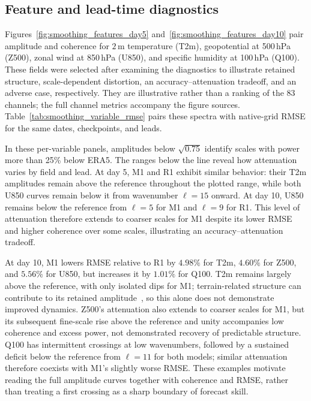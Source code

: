 \documentclass{article}
\newcommand{\vfourchange}[1]{{\color{blue}#1}}
\newcommand{\vfourred}[1]{{\color{blue}#1}}
\begin{document}
\subsection{\vfourred{Feature and lead-time diagnostics}}
\label{app:smoothing_features}
\label{app:smoothing_reset}

\vfourred{Figures~\ref{fig:smoothing_features_day5} and~\ref{fig:smoothing_features_day10} pair amplitude and coherence for $2$\,m temperature (T2m), geopotential at 500\,hPa (Z500), zonal wind at 850\,hPa (U850), and specific humidity at 100\,hPa (Q100). These fields were selected after examining the diagnostics to illustrate retained structure, scale-dependent distortion, an accuracy--attenuation tradeoff, and an adverse case, respectively. They are illustrative rather than a ranking of the 83 channels; the full channel metrics accompany the figure sources. Table~\ref{tab:smoothing_variable_rmse} pairs these spectra with native-grid RMSE for the same dates, checkpoints, and leads.}

\vfourred{In these per-variable panels, amplitudes below $\sqrt{0.75}$ identify scales with power more than 25\% below ERA5. The ranges below the line reveal how attenuation varies by field and lead. At day 5, M1 and \vfourchange{R1} exhibit similar behavior: their T2m amplitudes remain above the reference throughout the plotted range, while both U850 curves remain below it from wavenumber $\ell=15$ onward. At day 10, U850 remains below the reference from $\ell=5$ for M1 and $\ell=9$ for \vfourchange{R1}. This level of attenuation therefore extends to coarser scales for M1 despite its lower RMSE and higher coherence over some scales, illustrating an accuracy--attenuation tradeoff.}

\vfourred{At day 10, M1 lowers RMSE relative to \vfourchange{R1} by $4.98\%$ for T2m, $4.60\%$ for Z500, and $5.56\%$ for U850, but increases it by $1.01\%$ for Q100. T2m remains largely above the reference, with only isolated dips for M1; terrain-related structure can contribute to its retained amplitude~\citep{subich2025spectral}, so this alone does not demonstrate improved dynamics. Z500's attenuation also extends to coarser scales for M1, but its subsequent fine-scale rise above the reference and unity accompanies low coherence and excess power, not demonstrated recovery of predictable structure. Q100 has intermittent crossings at low wavenumbers, followed by a sustained deficit below the reference from $\ell=11$ for both models; similar attenuation therefore coexists with M1's slightly worse RMSE. These examples motivate reading the full amplitude curves together with coherence and RMSE, rather than treating a first crossing as a sharp boundary of forecast skill.}
\end{document}
